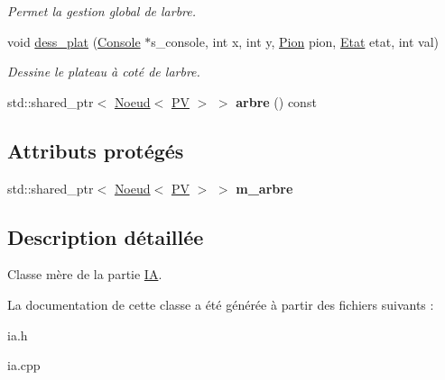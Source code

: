 \begin{DoxyCompactItemize}
\begin{DoxyCompactList}\small\item\em Permet la gestion global de l\textquotesingle{}arbre. \end{DoxyCompactList}\item 
void \hyperlink{classIA_a577fbb6c60b263de3d62b93052197db6}{dess\+\_\+plat} (\hyperlink{classConsole}{Console} $\ast$s\+\_\+console, int x, int y, \hyperlink{structPion}{Pion} pion, \hyperlink{structEtat}{Etat} etat, int val)\hypertarget{classIA_a577fbb6c60b263de3d62b93052197db6}{}\label{classIA_a577fbb6c60b263de3d62b93052197db6}

\begin{DoxyCompactList}\small\item\em Dessine le plateau à coté de l\textquotesingle{}arbre. \end{DoxyCompactList}\item 
std\+::shared\+\_\+ptr$<$ \hyperlink{classNoeud}{Noeud}$<$ \hyperlink{structIA_1_1PV}{PV} $>$ $>$ {\bfseries arbre} () const \hypertarget{classIA_a27c2b1942849e7fbd4c77f4c0fa0d88d}{}\label{classIA_a27c2b1942849e7fbd4c77f4c0fa0d88d}

\end{DoxyCompactItemize}
\subsection*{Attributs protégés}
\begin{DoxyCompactItemize}
\item 
std\+::shared\+\_\+ptr$<$ \hyperlink{classNoeud}{Noeud}$<$ \hyperlink{structIA_1_1PV}{PV} $>$ $>$ {\bfseries m\+\_\+arbre}\hypertarget{classIA_a6666e00b08d090ab464d1847c6b9db32}{}\label{classIA_a6666e00b08d090ab464d1847c6b9db32}

\end{DoxyCompactItemize}


\subsection{Description détaillée}
Classe mère de la partie \hyperlink{classIA}{IA}. 

La documentation de cette classe a été générée à partir des fichiers suivants \+:\begin{DoxyCompactItemize}
\item 
ia.\+h\item 
ia.\+cpp\end{DoxyCompactItemize}
